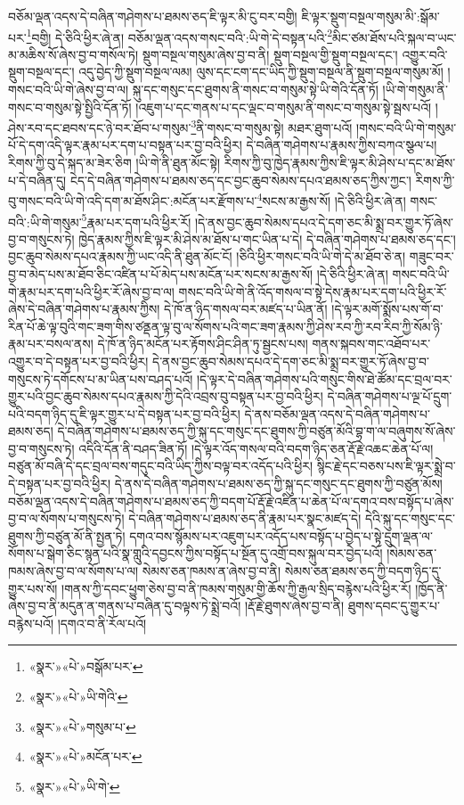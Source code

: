བཅོམ་ལྡན་འདས་དེ་བཞིན་གཤེགས་པ་ཐམས་ཅད་ཇི་ལྟར་མི་ངུ་བར་བགྱི། ཇི་ལྟར་སྡུག་བསྔལ་གསུམ་མི་:སྒོམ་པར་\footnote{«སྣར་»«པེ་»བསྒོམ་པར་}བགྱི། དེ་ཅིའི་ཕྱིར་ཞེ་ན། བཅོམ་ལྡན་འདས་གསང་བའི་:ཡི་གེ་དེ་བསྟན་པའི་\footnote{«སྣར་»«པེ་»ཡི་གེའི་}མིང་ཙམ་ཐོས་པའི་སྐལ་བ་ཡང་མ་མཆིས་སོ་ཞེས་བྱ་བ་གསོལ་ཏེ། སྡུག་བསྔལ་གསུམ་ཞེས་བྱ་བ་ནི། སྡུག་བསྔལ་གྱི་སྡུག་བསྔལ་དང་། འགྱུར་བའི་སྡུག་བསྔལ་དང་། འདུ་བྱེད་ཀྱི་སྡུག་བསྔལ་ལམ། ལུས་དང་ངག་དང་ཡིད་ཀྱི་སྡུག་བསྔལ་ནི་སྡུག་བསྔལ་གསུམ་མོ། །གསང་བའི་ཡི་གེ་ཞེས་བྱ་བ་ལ། སྐུ་དང་གསུང་དང་ཐུགས་ནི་གསང་བ་གསུམ་སྟེ་ཡི་གེའི་དོན་ཏོ། །ཡི་གེ་གསུམ་ནི་གསང་བ་གསུམ་སྟེ་སྤྱིའི་དོན་ཏོ། །འཇུག་པ་དང་གནས་པ་དང་ལྡང་བ་གསུམ་ནི་གསང་བ་གསུམ་སྟེ་སྦས་པའོ། །ཤེས་རབ་དང་ཐབས་དང་ཉེ་བར་ཐོབ་པ་གསུམ་\footnote{«སྣར་»«པེ་»གསུམ་པ་}ནི་གསང་བ་གསུམ་སྟེ། མཐར་ཐུག་པའོ། །གསང་བའི་ཡི་གེ་གསུམ་པོ་དེ་དག་འདི་ལྟར་རྣམ་པར་དག་པ་བསྟན་པར་བྱ་བའི་ཕྱིར། དེ་བཞིན་གཤེགས་པ་རྣམས་ཀྱིས་བཀའ་སྩལ་པ། རིགས་ཀྱི་བུ་དེ་སྐད་མ་ཟེར་ཅིག །ཡི་གེ་ནི་ཐུན་མོང་སྟེ། རིགས་ཀྱི་བུ་ཁྱེད་རྣམས་ཀྱིས་ཇི་ལྟར་མི་ཤེས་པ་དང་མ་ཐོས་པ་དེ་བཞིན་དུ། ངེད་དེ་བཞིན་གཤེགས་པ་ཐམས་ཅད་དང་བྱང་ཆུབ་སེམས་དཔའ་ཐམས་ཅད་ཀྱིས་ཀྱང་། རིགས་ཀྱི་བུ་གསང་བའི་ཡི་གེ་འདི་དག་མ་ཐོས་ཤིང་:མངོན་པར་རྫོགས་པ་\footnote{«སྣར་»«པེ་»མངོན་པར་}སངས་མ་རྒྱས་སོ། །དེ་ཅིའི་ཕྱིར་ཞེ་ན། གསང་བའི་:ཡི་གེ་གསུམ་\footnote{«སྣར་»«པེ་»ཡི་གེ་}རྣམ་པར་དག་པའི་ཕྱིར་རོ། །དེ་ནས་བྱང་ཆུབ་སེམས་དཔའ་དེ་དག་ཅང་མི་སྨྲ་བར་གྱུར་ཏོ་ཞེས་བྱ་བ་གསུངས་ཏེ། ཁྱེད་རྣམས་ཀྱིས་ཇི་ལྟར་མི་ཤེས་མ་ཐོས་པ་གང་ཡིན་པ་དེ། དེ་བཞིན་གཤེགས་པ་ཐམས་ཅད་དང་། བྱང་ཆུབ་སེམས་དཔའ་རྣམས་ཀྱི་ཡང་འདི་ནི་ཐུན་མོང་ངོ། །ཅིའི་ཕྱིར་གསང་བའི་ཡི་གེ་དེ་མ་ཐོབ་ཅེ་ན། གཟུང་བར་བྱ་བ་མེད་པས་མ་ཐོབ་ཅིང་འཛིན་པ་པོ་མེད་པས་མངོན་པར་སངས་མ་རྒྱས་སོ། །དེ་ཅིའི་ཕྱིར་ཞེ་ན། གསང་བའི་ཡི་གེ་རྣམ་པར་དག་པའི་ཕྱིར་རོ་ཞེས་བྱ་བ་ལ། གསང་བའི་ཡི་གེ་ནི་འོད་གསལ་བ་སྟེ་དེས་རྣམ་པར་དག་པའི་ཕྱིར་རོ་ཞེས་དེ་བཞིན་གཤེགས་པ་རྣམས་ཀྱིས། དེ་ཁོ་ན་ཉིད་གསལ་བར་མཛད་པ་ཡིན་ནོ། །དེ་ལྟར་མགོ་སྨོས་པས་གོ་བ་རིན་པོ་ཆེ་ལྟ་བུའི་གང་ཟག་གིས་ཙནྡན་ལྟ་བུ་ལ་སོགས་པའི་གང་ཟག་རྣམས་ཀྱི་ཤེས་རབ་ཀྱི་རབ་རིབ་ཀྱི་སོམ་ཉི་རྣམ་པར་བསལ་ནས། དེ་ཁོ་ན་ཉིད་མངོན་པར་རྟོགས་ཤིང་ཤིན་ཏུ་སྦྱངས་པས། གནས་སྐབས་གང་འཐོབ་པར་འགྱུར་བ་དེ་བསྟན་པར་བྱ་བའི་ཕྱིར། དེ་ནས་བྱང་ཆུབ་སེམས་དཔའ་དེ་དག་ཅང་མི་སྨྲ་བར་གྱུར་ཏོ་ཞེས་བྱ་བ་གསུངས་ཏེ་དགོངས་པ་མ་ཡིན་པས་བཤད་པའོ། །དེ་ལྟར་དེ་བཞིན་གཤེགས་པའི་གསུང་གིས་ཐེ་ཚོམ་དང་བྲལ་བར་གྱུར་པའི་བྱང་ཆུབ་སེམས་དཔའ་རྣམས་ཀྱི་དེའི་འབྲས་བུ་བསྟན་པར་བྱ་བའི་ཕྱིར། དེ་བཞིན་གཤེགས་པ་ལྔ་པོ་དྲུག་པའི་བདག་ཉིད་དུ་ཇི་ལྟར་གྱུར་པ་དེ་བསྟན་པར་བྱ་བའི་ཕྱིར། དེ་ནས་བཅོམ་ལྡན་འདས་དེ་བཞིན་གཤེགས་པ་ཐམས་ཅད། དེ་བཞིན་གཤེགས་པ་ཐམས་ཅད་ཀྱི་སྐུ་དང་གསུང་དང་ཐུགས་ཀྱི་བཙུན་མོའི་བྷ་ག་ལ་བཞུགས་སོ་ཞེས་བྱ་བ་གསུངས་ཏེ། འདིའི་དོན་ནི་བཤད་ཟིན་ཏོ། །དེ་ལྟར་འོད་གསལ་བའི་བདག་ཉིད་ཅན་རྡོ་རྗེ་འཆང་ཆེན་པོ་ལ། བཙུན་མོ་བཞི་དེ་དང་བྲལ་བས་གདུང་བའི་ཡིད་ཀྱིས་བལྟ་བར་འདོད་པའི་ཕྱིར། སྙིང་རྗེ་དང་བཅས་པས་ཇི་ལྟར་སྨྲེ་བ་དེ་བསྟན་པར་བྱ་བའི་ཕྱིར། དེ་ནས་དེ་བཞིན་གཤེགས་པ་ཐམས་ཅད་ཀྱི་སྐུ་དང་གསུང་དང་ཐུགས་ཀྱི་བཙུན་མོས། བཅོམ་ལྡན་འདས་དེ་བཞིན་གཤེགས་པ་ཐམས་ཅད་ཀྱི་བདག་པོ་རྡོ་རྗེ་འཛིན་པ་ཆེན་པོ་ལ་དགའ་བས་བསྟོད་པ་ཞེས་བྱ་བ་ལ་སོགས་པ་གསུངས་ཏེ། དེ་བཞིན་གཤེགས་པ་ཐམས་ཅད་ནི་རྣམ་པར་སྣང་མཛད་དེ། དེའི་སྐུ་དང་གསུང་དང་ཐུགས་ཀྱི་བཙུན་མོ་ནི་སྤྱན་ཏེ། དགའ་བས་སྙོམས་པར་འཇུག་པར་འདོད་པས་བསྟོད་པ་བྱེད་པ་སྟེ་དྲུག་ལྡན་ལ་སོགས་པ་སྒེག་ཅིང་སྙན་པའི་སྣ་གླུའི་དབྱངས་ཀྱིས་བསྟོད་པ་སྔོན་དུ་འགྲོ་བས་སྐུལ་བར་བྱེད་པའོ། །སེམས་ཅན་ཁམས་ཞེས་བྱ་བ་ལ་སོགས་པ་ལ། སེམས་ཅན་ཁམས་ན་ཞེས་བྱ་བ་ནི། སེམས་ཅན་ཐམས་ཅད་ཀྱི་བདག་ཉིད་དུ་གྱུར་པས་སོ། །གནས་ཀྱི་དབང་ཕྱུག་ཅེས་བྱ་བ་ནི་ཁམས་གསུམ་གྱི་ཆོས་ཀྱི་རྒྱལ་སྲིད་བརྙེས་པའི་ཕྱིར་རོ། །ཁྱོད་ནི་ཞེས་བྱ་བ་ནི་མདུན་ན་གནས་པ་བཞིན་དུ་བལྟས་ཏེ་སྨྲེ་བའོ། །རྡོ་རྗེ་ཐུགས་ཞེས་བྱ་བ་ནི། ཐུགས་དབང་དུ་གྱུར་པ་བརྙེས་པའོ། །དགའ་བ་ནི་རོལ་པའོ། 